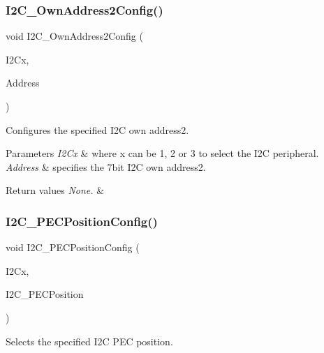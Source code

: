 \subsubsection{\texorpdfstring{I2\+C\+\_\+\+Own\+Address2\+Config()}{I2C\_OwnAddress2Config()}}
{\footnotesize\ttfamily void I2\+C\+\_\+\+Own\+Address2\+Config (\begin{DoxyParamCaption}\item[{I2\+C\+\_\+\+Type\+Def $\ast$}]{I2\+Cx,  }\item[{uint8\+\_\+t}]{Address }\end{DoxyParamCaption})}



Configures the specified I2C own address2. 


\begin{DoxyParams}{Parameters}
{\em I2\+Cx} & where x can be 1, 2 or 3 to select the I2C peripheral. \\
\hline
{\em Address} & specifies the 7bit I2C own address2. \\
\hline
\end{DoxyParams}

\begin{DoxyRetVals}{Return values}
{\em None.} & \\
\hline
\end{DoxyRetVals}
\mbox{\label{group___i2_c_ga5d0f939bdd45542502827bf408f24161}} 
\subsubsection{\texorpdfstring{I2\+C\+\_\+\+P\+E\+C\+Position\+Config()}{I2C\_PECPositionConfig()}}
{\footnotesize\ttfamily void I2\+C\+\_\+\+P\+E\+C\+Position\+Config (\begin{DoxyParamCaption}\item[{I2\+C\+\_\+\+Type\+Def $\ast$}]{I2\+Cx,  }\item[{uint16\+\_\+t}]{I2\+C\+\_\+\+P\+E\+C\+Position }\end{DoxyParamCaption})}



Selects the specified I2C P\+EC position. 


